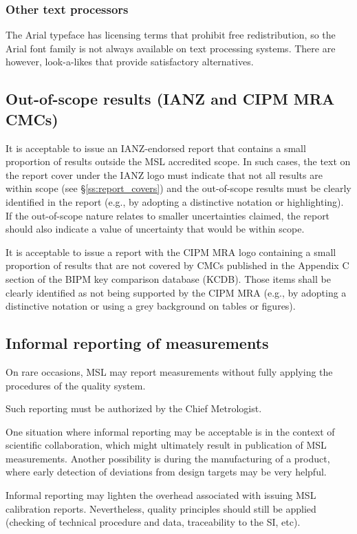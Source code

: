 \subsubsection{Other text processors}
The Arial typeface has licensing terms that prohibit free redistribution, so the Arial font family is not always available on text processing systems. There are however, look-a-likes that provide satisfactory alternatives.

\subsection{Out-of-scope results (IANZ and CIPM MRA CMCs)}
It is acceptable to issue an IANZ-endorsed report that contains a small proportion of results outside the MSL accredited scope. In such cases, the text on the report cover under the IANZ logo must indicate that not all results are within scope (see \S\ref{ss:report_covers}) and the out-of-scope results must be clearly identified in the report (e.g., by adopting a distinctive notation or highlighting). If the out-of-scope nature relates to smaller uncertainties claimed, the report should also indicate a value of uncertainty that would be within scope.

It is acceptable to issue a report with the CIPM MRA logo containing a small proportion of results that are not covered by CMCs published in the Appendix C section of the BIPM key comparison database (KCDB). Those items shall be clearly identified as not being supported by the CIPM MRA (e.g., by adopting a distinctive notation or using a grey background on tables or figures).

\subsection{Informal reporting of measurements}
 \label{ss:informal_reporting}
On rare occasions, MSL may report measurements without fully applying the procedures of the quality system. 

Such reporting must be authorized by the Chief Metrologist.

One situation where informal reporting may be acceptable is in the context of scientific collaboration, which might ultimately result in publication of MSL measurements. Another possibility is during the manufacturing of a product, where early detection of deviations from design targets may be very helpful.

Informal reporting may lighten the overhead associated with issuing MSL calibration reports. Nevertheless, quality principles should still be applied (checking of technical procedure and data, traceability to the SI, etc).

